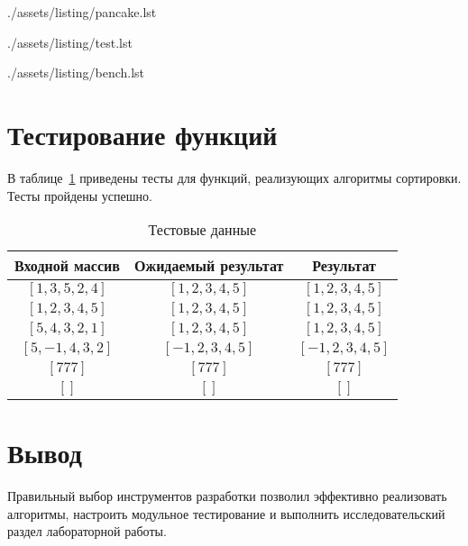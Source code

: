 \clearpage
\begin{lstinputlisting}[
	caption={Алгоритм блинной сортировки},
	label={lst:pancake},
	style={golang}
]{./assets/listing/pancake.lst}
\end{lstinputlisting}

\clearpage
\begin{lstinputlisting}[
	caption={Пример реализации теста},
	label={lst:tests},
	style={golang}
]{./assets/listing/test.lst}
\end{lstinputlisting}

\begin{lstinputlisting}[
	caption={Пример реализации бенчмарка},
	label={lst:benches},
	style={golang}
]{./assets/listing/bench.lst}
\end{lstinputlisting}

\section{Тестирование функций}

В таблице~\ref{tbl:test} приведены тесты для функций, реализующих алгоритмы сортировки. Тесты пройдены успешно.

\begin{table}[h!]
	\begin{center}
		\caption{\label{tbl:test}Тестовые данные}
		\begin{tabular}{|c|c|c|}
			\hline
			Входной массив & Ожидаемый результат & Результат \\ 
			\hline
			$[1,3,5,2,4]$ & $[1,2,3,4,5]$  & $[1,2,3,4,5]$\\
			$[1,2,3,4,5]$  & $[1,2,3,4,5]$ & $[1,2,3,4,5]$\\
			$[5,4,3,2,1]$  & $[1,2,3,4,5]$  & $[1,2,3,4,5]$\\
			$[5,-1,4,3,2]$  & $[-1,2,3,4,5]$  & $[-1,2,3,4,5]$\\
			$[777]$  & $[777]$  & $[777]$\\
			$[]$  & $[]$  & $[]$\\
			\hline
		\end{tabular}
	\end{center}
\end{table}

\section*{Вывод}

Правильный выбор инструментов разработки позволил эффективно реализовать алгоритмы, настроить модульное тестирование и выполнить исследовательский раздел лабораторной работы.
